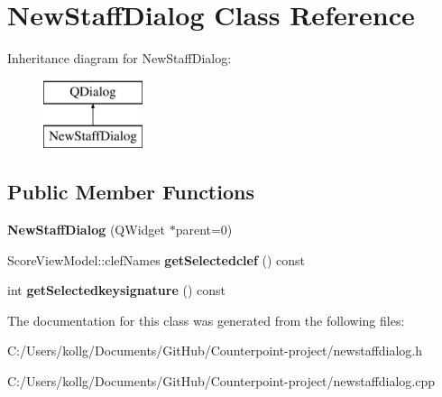 \hypertarget{class_new_staff_dialog}{}\section{New\+Staff\+Dialog Class Reference}
\label{class_new_staff_dialog}
Inheritance diagram for New\+Staff\+Dialog\+:\begin{figure}[H]
\begin{center}
\leavevmode
\includegraphics[height=2.000000cm]{class_new_staff_dialog}
\end{center}
\end{figure}
\subsection*{Public Member Functions}
\begin{DoxyCompactItemize}
\item 
\hypertarget{class_new_staff_dialog_a432b7b4d4dcf8cc9ef4ba91bd7a59eba}{}{\bfseries New\+Staff\+Dialog} (Q\+Widget $\ast$parent=0)\label{class_new_staff_dialog_a432b7b4d4dcf8cc9ef4ba91bd7a59eba}

\item 
\hypertarget{class_new_staff_dialog_a51da86da089ddc3b225c0ad3b2cdc64d}{}Score\+View\+Model\+::clef\+Names {\bfseries get\+Selectedclef} () const \label{class_new_staff_dialog_a51da86da089ddc3b225c0ad3b2cdc64d}

\item 
\hypertarget{class_new_staff_dialog_a0ecb9912f41ddaba3ade539bca33cd46}{}int {\bfseries get\+Selectedkeysignature} () const \label{class_new_staff_dialog_a0ecb9912f41ddaba3ade539bca33cd46}

\end{DoxyCompactItemize}


The documentation for this class was generated from the following files\+:\begin{DoxyCompactItemize}
\item 
C\+:/\+Users/kollg/\+Documents/\+Git\+Hub/\+Counterpoint-\/project/newstaffdialog.\+h\item 
C\+:/\+Users/kollg/\+Documents/\+Git\+Hub/\+Counterpoint-\/project/newstaffdialog.\+cpp\end{DoxyCompactItemize}
